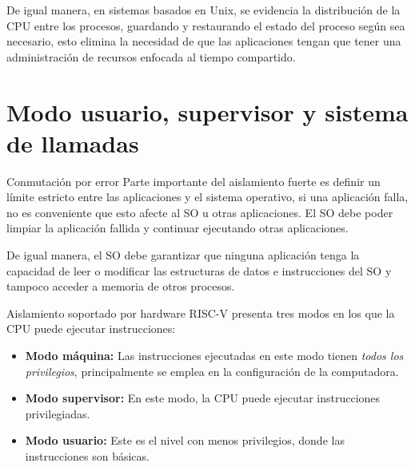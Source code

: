 \documentclass{libs/ufc_format}
\begin{document}
\begin{frame}
  De igual manera, en sistemas basados en Unix, se evidencia la distribución de la CPU entre los procesos, guardando y restaurando el estado del proceso según sea necesario, esto elimina la necesidad de que las aplicaciones tengan que tener una administración de recursos enfocada al tiempo compartido.\newline
\end{frame}
\section{Modo usuario, supervisor y sistema de llamadas}
\begin{frame}{Conmutación por error}
  Parte importante del aislamiento fuerte es definir un límite estricto entre las aplicaciones y el sistema operativo, si una aplicación falla, no es conveniente que esto afecte al SO u otras aplicaciones. El SO debe poder limpiar la aplicación fallida y continuar ejecutando otras aplicaciones.

  \vspace{0.3cm}

  De igual manera, el SO debe garantizar que ninguna aplicación tenga la capacidad de leer o modificar las estructuras de datos e instrucciones del SO y tampoco acceder a memoria de otros procesos.
\end{frame}
\begin{frame}{Aislamiento soportado por hardware}
  RISC-V presenta tres modos en los que la CPU puede ejecutar instrucciones:
  \begin{itemize}
    \item \textbf{Modo máquina:} Las instrucciones ejecutadas en este modo tienen \emph{todos los privilegios}, principalmente se emplea en la configuración de la computadora. \newline
    \item \textbf{Modo supervisor:} En este modo, la CPU puede ejecutar instrucciones privilegiadas. \newline
    \item \textbf{Modo usuario:} Este es el nivel con menos privilegios, donde las instrucciones son básicas. \newline
  \end{itemize}
\end{frame}
\end{document}
